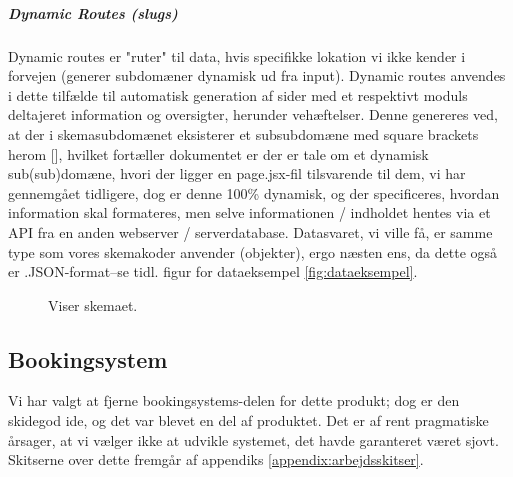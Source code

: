     \subparagraph{Dynamic Routes (slugs)}
    Dynamic routes er "ruter" til data, hvis specifikke lokation vi ikke kender i forvejen (generer subdomæner dynamisk ud fra input). Dynamic routes anvendes i dette tilfælde til automatisk generation af sider med et respektivt moduls deltajeret information og oversigter, herunder vehæftelser. 
    Denne genereres ved, at der i skemasubdomænet eksisterer et subsubdomæne med square brackets herom [], hvilket fortæller dokumentet er der er tale om et dynamisk sub(sub)domæne, hvori der ligger en page.jsx-fil tilsvarende til dem, vi har gennemgået tidligere, dog er denne 100\% dynamisk, og der specificeres, hvordan information skal formateres, men selve informationen / indholdet hentes via et API fra en anden webserver / serverdatabase. Datasvaret, vi ville få, er samme type som vores skemakoder anvender (objekter), ergo næsten ens, da dette også er .JSON-format--se tidl. figur for dataeksempel \ref{fig:dataeksempel}. 
        \begin{figure}[H]
        \centering
        \caption{Viser skemaet.}
        \end{figure}
\subsection{Bookingsystem}
    Vi har valgt at fjerne bookingsystems-delen for dette produkt; dog er den skidegod ide, og det var blevet en del af produktet. Det er af rent pragmatiske årsager, at vi vælger ikke at udvikle systemet, det havde garanteret været sjovt. Skitserne over dette fremgår af appendiks \ref{appendix:arbejdsskitser}.